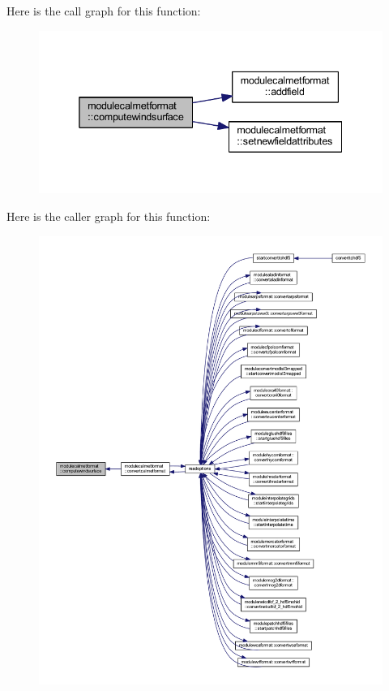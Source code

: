 Here is the call graph for this function\+:\nopagebreak
\begin{figure}[H]
\begin{center}
\leavevmode
\includegraphics[width=338pt]{namespacemodulecalmetformat_ac65fd3f15792bec4c3a1f8809e7d201a_cgraph}
\end{center}
\end{figure}
Here is the caller graph for this function\+:\nopagebreak
\begin{figure}[H]
\begin{center}
\leavevmode
\includegraphics[width=350pt]{namespacemodulecalmetformat_ac65fd3f15792bec4c3a1f8809e7d201a_icgraph}
\end{center}
\end{figure}
\mbox{\label{namespacemodulecalmetformat_a46e7b8dbd76c834dd87aa502fa427ecf}} 
